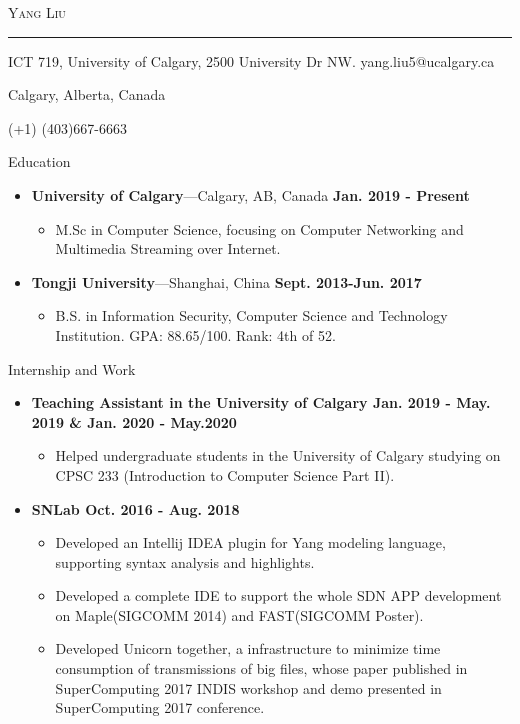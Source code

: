 \documentclass[10pt,oneside]{article}
\newcommand{\bigname}[1]{
	\begin{center}\fontfamily{phv}\selectfont\Huge\scshape#1\end{center}
}
\newenvironment{ressection}[1]{
	\vspace{4pt}
	{\fontfamily{phv}\selectfont\Large#1}
	\begin{itemize}
	\vspace{3pt}
}{
	\end{itemize}
}
\newcommand{\resitem}[1]{
	\vspace{-4pt}
	\item \begin{flushleft} #1 \end{flushleft}
}
\newcommand{\ressubitem}[1]{
	\vspace{-1pt}
	\item \begin{flushleft} #1 \end{flushleft}
}
\newcommand{\resbigitem}[3]{
	\vspace{-5pt}
	\item
	\textbf{#1}---#2 \
	\textit{#3}
}
\newenvironment{ressubsec}[3]{
	\resbigitem{#1}{#2}{#3}
	\vspace{-2pt}
	\begin{itemize}
}{
	\end{itemize}
}
\newenvironment{reslist}[1]{
	\resitem{\textbf{#1}}
	\vspace{-5pt}
	\begin{itemize}
}{
	\end{itemize}
}
\begin{document}
 \selectfont

\bigname{Yang Liu}

\vspace{-8pt} \rule{\textwidth}{1pt}

\vspace{-1pt} {ICT 719, University of Calgary, 2500 University Dr NW. \hfill yang.liu5@ucalgary.ca}

\vspace{-1pt} {Calgary, Alberta, Canada}

\vspace{-1pt} {(+1) (403)667-6663}

\vspace{8 pt}

\newcommand{\textsharp}{$\sharp$}

\begin{ressection}{Education}
	\begin{ressubsec}{University of Calgary}{Calgary, AB, Canada \hfill \textbf{Jan. 2019 - Present}}{}
		\ressubitem{M.Sc in Computer Science, focusing on Computer Networking and
      Multimedia Streaming over Internet.}
	\end{ressubsec}
	\begin{ressubsec}{Tongji University}{Shanghai, China \hfill \textbf{Sept. 2013-Jun. 2017}}{}
		\ressubitem{B.S. in Information Security, Computer Science and Technology Institution. GPA: 88.65/100. Rank: 4th of 52. }
	\end{ressubsec}
\end{ressection}


\begin{ressection}{Internship and Work}
  \begin{reslist}{Teaching Assistant in the University of Calgary \hfill Jan. 2019 - May. 2019 \& Jan. 2020 - May.2020}
    \ressubitem{Helped undergraduate students in the University of
      Calgary studying on CPSC 233 (Introduction to Computer Science Part II). }
  \end{reslist}
	\begin{reslist}{SNLab \hfill Oct. 2016 - Aug. 2018}
		\ressubitem{Developed an Intellij IDEA plugin for Yang modeling language, supporting syntax analysis and highlights.}
        \ressubitem{Developed a complete IDE to support the whole SDN APP development on Maple(SIGCOMM 2014) and FAST(SIGCOMM Poster).}
		\ressubitem{Developed Unicorn together, a infrastructure to minimize time
      consumption of transmissions of big files, whose paper published in
      SuperComputing 2017 INDIS workshop and demo presented in SuperComputing
      2017 conference. }
	\end{reslist}
\end{ressection}
\end{document}
